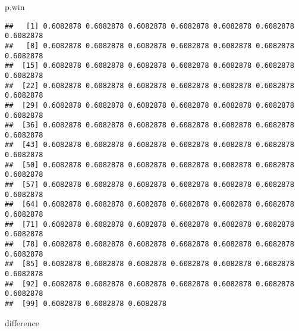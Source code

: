 \documentclass[
]{article}
\newenvironment{Shaded}{\begin{snugshade}}{\end{snugshade}}
\newcommand{\NormalTok}[1]{#1}
\begin{document}
\begin{Shaded}
\begin{Highlighting}[]
\NormalTok{p.win  }
\end{Highlighting}
\end{Shaded}

\begin{verbatim}
##   [1] 0.6082878 0.6082878 0.6082878 0.6082878 0.6082878 0.6082878 0.6082878
##   [8] 0.6082878 0.6082878 0.6082878 0.6082878 0.6082878 0.6082878 0.6082878
##  [15] 0.6082878 0.6082878 0.6082878 0.6082878 0.6082878 0.6082878 0.6082878
##  [22] 0.6082878 0.6082878 0.6082878 0.6082878 0.6082878 0.6082878 0.6082878
##  [29] 0.6082878 0.6082878 0.6082878 0.6082878 0.6082878 0.6082878 0.6082878
##  [36] 0.6082878 0.6082878 0.6082878 0.6082878 0.6082878 0.6082878 0.6082878
##  [43] 0.6082878 0.6082878 0.6082878 0.6082878 0.6082878 0.6082878 0.6082878
##  [50] 0.6082878 0.6082878 0.6082878 0.6082878 0.6082878 0.6082878 0.6082878
##  [57] 0.6082878 0.6082878 0.6082878 0.6082878 0.6082878 0.6082878 0.6082878
##  [64] 0.6082878 0.6082878 0.6082878 0.6082878 0.6082878 0.6082878 0.6082878
##  [71] 0.6082878 0.6082878 0.6082878 0.6082878 0.6082878 0.6082878 0.6082878
##  [78] 0.6082878 0.6082878 0.6082878 0.6082878 0.6082878 0.6082878 0.6082878
##  [85] 0.6082878 0.6082878 0.6082878 0.6082878 0.6082878 0.6082878 0.6082878
##  [92] 0.6082878 0.6082878 0.6082878 0.6082878 0.6082878 0.6082878 0.6082878
##  [99] 0.6082878 0.6082878 0.6082878
\end{verbatim}

\begin{Shaded}
\begin{Highlighting}[]
\NormalTok{difference}
\end{Highlighting}
\end{Shaded}
\end{document}
